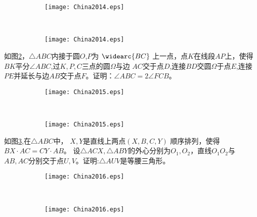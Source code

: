\documentclass{article}
\begin{document}
\begin{figure}[!ht]
    \centering
    \begin{subfigure}[b]{0.45\textwidth}
    	\texttt{[image: China2014.eps]}
    	\caption{}\label{fig:China2014}
    \end{subfigure}~
    \begin{subfigure}[b]{0.45\textwidth}
    	\texttt{[image: China2014.eps]}
    	\caption{}
    \end{subfigure}
    \caption{}
\end{figure}

\begin{Exercise}[title = {2015年，50分}]
如图\ref{fig:China2015}，$\triangle ABC$内接于圆$O$,$P$为
$\widearc{BC}$ 上一点，点$K$在线段$AP$上，使得$BK$平分$\angle ABC$,过$K,P,C$三点的圆$\Omega$与边
$AC$交于点$D$,连接$BD$交圆$\Omega$于点$E$,连接$PE$并延长与边$AB$交于点$F$。证明：$\angle ABC=2\angle FCB$。
\end{Exercise}

\begin{figure}[!ht]
\centering
\begin{subfigure}[b]{0.45\textwidth}
	\texttt{[image: China2015.eps]}
	\caption{}\label{fig:China2015}
\end{subfigure}~
\begin{subfigure}[b]{0.45\textwidth}
	\texttt{[image: China2015.eps]}
	\caption{}
\end{subfigure}
\caption{}
\end{figure}

\begin{Exercise}[title = {2016年，40分}]
如图\ref{fig:China2016},在$\triangle ABC$中， $X,Y$是直线上两点$(X,B,C,Y)$
顺序排列，使得$BX\cdot AC =CY\cdot AB$。 设$\triangle ACX,\triangle ABY$的外心分别为$O_1,O_2$，直线$O_1O_2$与
$AB,AC$分别交于点$U,V$。证明:$\triangle AUV$是等腰三角形。
\end{Exercise}

\begin{figure}[!ht]
\centering
\begin{subfigure}[b]{0.45\textwidth}
	\texttt{[image: China2016.eps]}
	 \caption{}\label{fig:China2016}
\end{subfigure}~
\begin{subfigure}[b]{0.45\textwidth}
	\texttt{[image: China2016.eps]}
	\caption{}
\end{subfigure}
\caption{}
\end{figure}
   
\end{document}
